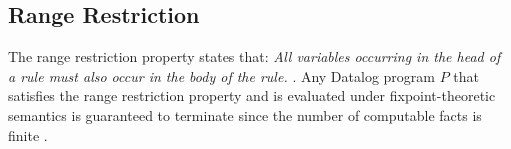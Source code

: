 \subsection{Range Restriction}
The range restriction property states that: \textit{ All variables occurring in the head of a rule must also occur in the body of the rule. } \cite{Ceri:1989:YAW:627272.627357}. Any Datalog program $P$ that satisfies the range restriction property and is evaluated under fixpoint-theoretic semantics is guaranteed to terminate since the number of computable facts is finite \cite{Ceri:1989:YAW:627272.627357}.